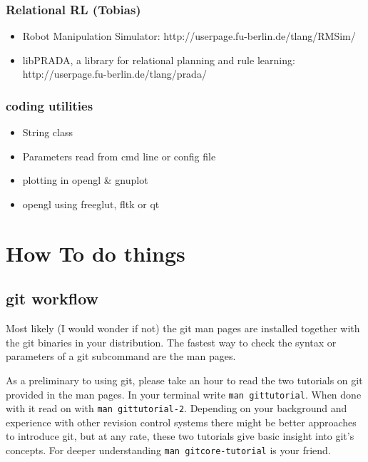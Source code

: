 \subsubsection{Relational RL (Tobias)}

\begin{itemize}
\item Robot Manipulation Simulator: http://userpage.fu-berlin.de/tlang/RMSim/

\item libPRADA, a library for relational planning and rule learning: http://userpage.fu-berlin.de/tlang/prada/
\end{itemize}


\subsubsection{coding utilities}

\begin{itemize}
\item String class

\item Parameters read from cmd line or config file

\item plotting in opengl \& gnuplot

\item opengl using freeglut, fltk or qt
\end{itemize}









\section{How To do things}


\subsection{git workflow}\label{secGit}

Most likely (I would wonder if not) the git man pages are installed
together with the git binaries in your distribution. The fastest way to
check the syntax or parameters of a git subcommand are the man pages. 

As a preliminary to using git, please take an hour to read the two
tutorials on git provided in the man pages. In your terminal write
\verb+man gittutorial+. When done with it read on with %
%
\verb+man gittutorial-2+. Depending on your background and experience
with other revision control systems there might be better approaches to
introduce git, but at any rate, these two tutorials give basic
insight into git's concepts. For deeper understanding %
%
\verb+man gitcore-tutorial+ is your friend.

